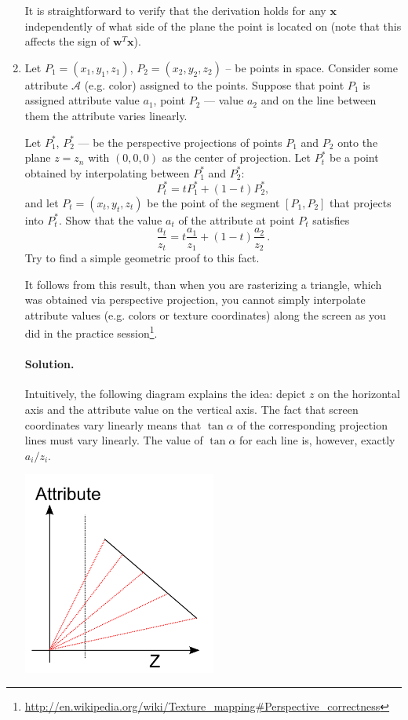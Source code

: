 \documentclass{article}
\newcommand{\bw}{\mathbf{w}}
\newcommand{\bx}{\mathbf{x}}
\begin{document}
\begin{enumerate}
It is straightforward to verify that the derivation holds for any $\bx$ independently of what side of the plane the point is located on (note that this affects the sign of $\bw^T\bx$).

\item Let $P_1 = (x_1, y_1, z_1)$, $P_2 = (x_2, y_2, z_2)$ -- be points in space. Consider some attribute $\mathcal{A}$ (e.g. color) assigned to the points. Suppose that point $P_1$ is assigned attribute value $a_1$, point $P_2$ --- value $a_2$ and on the line between them the attribute varies linearly.

Let $P_1^*$, $P_2^*$ --- be the perspective projections of points $P_1$ and $P_2$ onto the plane $z = z_n$ with $(0, 0, 0)$ as the center of projection.
Let $P_t^*$ be a point obtained by interpolating between $P_1^*$ and $P_2^*$: 
$$P_t^* = tP_1^* + (1-t)P_2^*,$$
and let $P_t = (x_t, y_t, z_t)$ be the point of the segment $[P_1, P_2]$ that projects into $P_t^*$. Show that the value $a_t$ of the attribute at point $P_t$ satisfies
\[ \frac{a_t}{z_t} = t \frac{a_1}{z_1} + (1-t)\frac{a_2}{z_2}\, .\]
Try to find a simple geometric proof to this fact.

It follows from this result, than when you are rasterizing a triangle, which was obtained via perspective projection, you cannot simply interpolate attribute values (e.g. colors or texture coordinates) along the screen as you did in the practice session\footnote{\url{http://en.wikipedia.org/wiki/Texture_mapping\#Perspective_correctness}}.

\paragraph{Solution.}
Intuitively, the following diagram explains the idea: depict $z$ on the horizontal axis and the attribute value on the vertical axis. The fact that screen coordinates vary linearly means that $\tan \alpha$ of the corresponding projection lines must vary linearly. The value of $\tan \alpha$ for each line is, however, exactly $a_i/z_i$.

\begin{center}
\includegraphics[width=0.5\textwidth]{interpolation1.png}
\end{center}


\end{enumerate}
\end{document}
